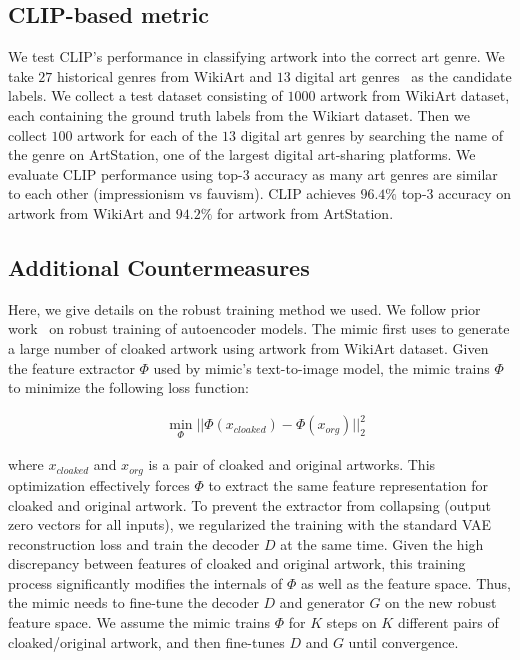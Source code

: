 \subsection{CLIP-based metric}
\label{app:clip}

We test CLIP's performance in classifying artwork into the correct art
genre. We take $27$ historical genres from WikiArt and $13$ digital art
genres~\cite{digital-styles} as the candidate labels. We collect a test
dataset consisting of $1000$ artwork from WikiArt dataset, each containing
the ground truth labels from the Wikiart dataset. Then we collect $100$
artwork for each of the $13$ digital art genres by searching the name of the
genre on ArtStation, one of the largest digital art-sharing platforms. We
evaluate CLIP performance using top-3 accuracy as many art genres are similar
to each other (\eg impressionism vs fauvism). CLIP achieves $96.4\%$ top-3
accuracy on artwork from WikiArt and $94.2\%$ for artwork from ArtStation.  


\subsection{Additional Countermeasures} 
\label{app:counter}

 Here, we give details on the robust
training method we used. We follow prior work~\cite{salehi2021arae} on robust
training of autoencoder models. The mimic first uses \system{} to generate a
large number of cloaked artwork using artwork from WikiArt dataset. Given the
feature extractor $\Phi$ used by mimic's text-to-image model, the mimic trains
$\Phi$ to minimize the following loss function:  

 \begin{eqnarray}
   &\min_{\Phi} ||\Phi(x_{cloaked}) - \Phi(x_{org})||_2^2
\end{eqnarray} 
\vspace{0.1in}

\noindent where $x_{cloaked}$ and $x_{org}$ is a pair of cloaked and original
artworks. This optimization effectively forces $\Phi$ to extract the same
feature representation for cloaked and original artwork. To prevent the
extractor from collapsing (\eg output zero vectors for all inputs), we
regularized the training with the standard VAE reconstruction loss and train
the decoder $D$ at the same time. Given the high discrepancy between features
of cloaked and original artwork, this training process significantly modifies
the internals of $\Phi$ as well as the feature space. Thus, the mimic needs
to fine-tune the decoder $D$ and generator $G$ on the new robust feature
space. We assume the mimic trains $\Phi$ for $K$ steps on $K$ different pairs of
cloaked/original artwork, and then fine-tunes $D$ and $G$ until convergence.  



